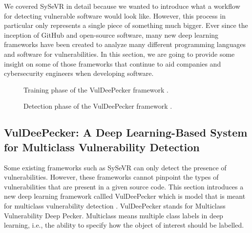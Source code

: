 \documentclass[12pt,twocolumn,letterpaper]{article}
\begin{document}
We covered SySeVR in detail because we wanted to introduce what a workflow for detecting vulnerable 
software would look like. However, this process in particular only represents a single piece of something 
much bigger. Ever since the inception of GitHub and open-source software, many new deep learning frameworks have been 
created to analyze many different programming languages and software for vulnerabilities. In this section, 
we are going to provide some insight on some of those frameworks that continue to aid companies and cybersecurity engineers 
when developing software.

\begin{figure}[h!]
    \centering
    \caption{Training phase of the VulDeePecker framework \cite{Zou21}.}
    \label{fig:af-0}
\end{figure}

\begin{figure}[h!]
    \centering
    \caption{Detection phase of the VulDeePecker framework \cite{Zou21}.}
    \label{fig:af-1}
\end{figure}

\subsection{VulDeePecker: A Deep Learning-Based System for Multiclass Vulnerability Detection}
\label{sub:vuledeepecker}

Some existing frameworks such as SySeVR can only detect the presence of vulnerabilities. However, these 
frameworks cannot pinpoint the types of vulnerabilities that are present in a given source code. This 
section introduces a new deep learning framework callled VulDeePecker which is model that is meant for 
multiclass vulnerability detection \cite{Zou21}.  VulDeePecker stands for Multiclass Vulnerability Deep Pecker.
Multiclass means multiple class labels in deep learning, i.e., the ability to specify how the object of interest 
should be labelled.
\end{document}
